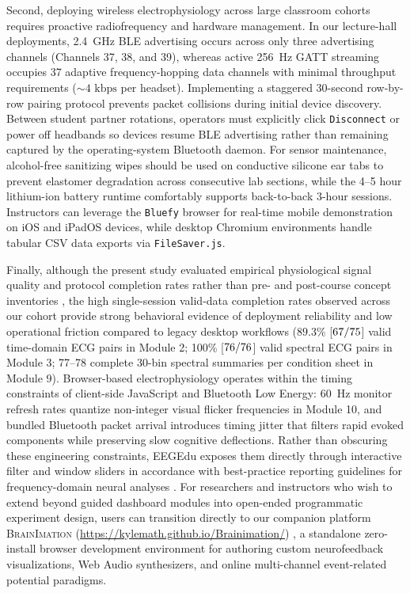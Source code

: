 \documentclass[11pt,letterpaper]{article}
\providecommand{\ModTwoSubmitted}{75}
\providecommand{\ModTwoPctValid}{89.3}
\providecommand{\ModThreeSubmitted}{76}
\begin{document}
Second, deploying wireless electrophysiology across large classroom cohorts requires proactive radiofrequency and hardware management. In our lecture-hall deployments, 2.4~GHz BLE advertising occurs across only three advertising channels (Channels 37, 38, and 39), whereas active 256~Hz GATT streaming occupies 37 adaptive frequency-hopping data channels with minimal throughput requirements ($\sim 4\text{ kbps}$ per headset). Implementing a staggered 30-second row-by-row pairing protocol prevents packet collisions during initial device discovery. Between student partner rotations, operators must explicitly click \texttt{Disconnect} or power off headbands so devices resume BLE advertising rather than remaining captured by the operating-system Bluetooth daemon. For sensor maintenance, alcohol-free sanitizing wipes should be used on conductive silicone ear tabs to prevent elastomer degradation across consecutive lab sections, while the 4--5 hour lithium-ion battery runtime comfortably supports back-to-back 3-hour sessions. Instructors can leverage the \texttt{Bluefy} browser for real-time mobile demonstration on iOS and iPadOS devices, while desktop Chromium environments handle tabular CSV data exports via \texttt{FileSaver.js}.

Finally, although the present study evaluated empirical physiological signal quality and protocol completion rates rather than pre- and post-course concept inventories \citep{segawa2019hands}, the high single-session valid-data completion rates observed across our cohort provide strong behavioral evidence of deployment reliability and low operational friction compared to legacy desktop workflows ($\ModTwoPctValid\%$ [$\ModTwoN/\ModTwoSubmitted$] valid time-domain ECG pairs in Module 2; 100\% [$\ModThreeN/\ModThreeSubmitted$] valid spectral ECG pairs in Module 3; 77--78 complete 30-bin spectral summaries per condition sheet in Module 9). Browser-based electrophysiology operates within the timing constraints of client-side JavaScript and Bluetooth Low Energy: 60~Hz monitor refresh rates quantize non-integer visual flicker frequencies in Module 10, and bundled Bluetooth packet arrival introduces timing jitter that filters rapid evoked components while preserving slow cognitive deflections. Rather than obscuring these engineering constraints, EEGEdu exposes them directly through interactive filter and window sliders in accordance with best-practice reporting guidelines for frequency-domain neural analyses \citep{keil2022recommendations}. For researchers and instructors who wish to extend beyond guided dashboard modules into open-ended programmatic experiment design, users can transition directly to our companion platform \textsc{BrainImation} (\url{https://kylemath.github.io/Brainimation/}) \citep{mathewson2026brainimation}, a standalone zero-install browser development environment for authoring custom neurofeedback visualizations, Web Audio synthesizers, and online multi-channel event-related potential paradigms.
\end{document}
